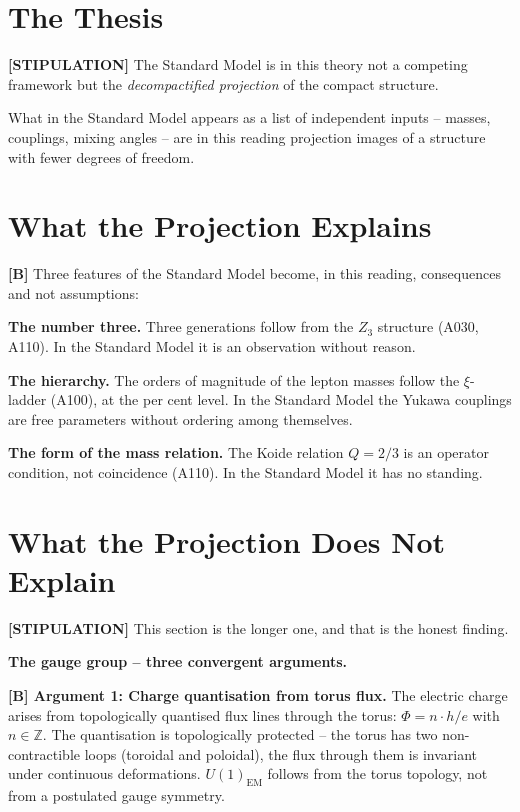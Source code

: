 \section{The Thesis}

\textbf{[STIPULATION]} The Standard Model is in this theory not a competing
framework but the \emph{decompactified projection} of the compact structure.

What in the Standard Model appears as a list of independent inputs -- masses,
couplings, mixing angles -- are in this reading projection images of a structure
with fewer degrees of freedom.

\section{What the Projection Explains}

\textbf{[B]} Three features of the Standard Model become, in this reading,
consequences and not assumptions:

\textbf{The number three.} Three generations follow from the $Z_3$ structure
(A030, A110). In the Standard Model it is an observation without reason.

\textbf{The hierarchy.} The orders of magnitude of the lepton masses follow the
$\xi$-ladder (A100), at the per cent level. In the Standard Model the Yukawa
couplings are free parameters without ordering among themselves.

\textbf{The form of the mass relation.} The Koide relation $Q=2/3$ is an operator
condition, not coincidence (A110). In the Standard Model it has no standing.

\section{What the Projection Does Not Explain}

\textbf{[STIPULATION]} This section is the longer one, and that is the honest
finding.

\textbf{The gauge group -- three convergent arguments.}

\textbf{[B] Argument 1: Charge quantisation from torus flux.}
The electric charge arises from topologically quantised flux lines through the
torus: $\Phi=n\cdot h/e$ with $n\in\mathbb{Z}$. The quantisation is topologically
protected -- the torus has two non-contractible loops (toroidal and poloidal), the
flux through them is invariant under continuous deformations. $U(1)_\text{EM}$
follows from the torus topology, not from a postulated gauge symmetry.

